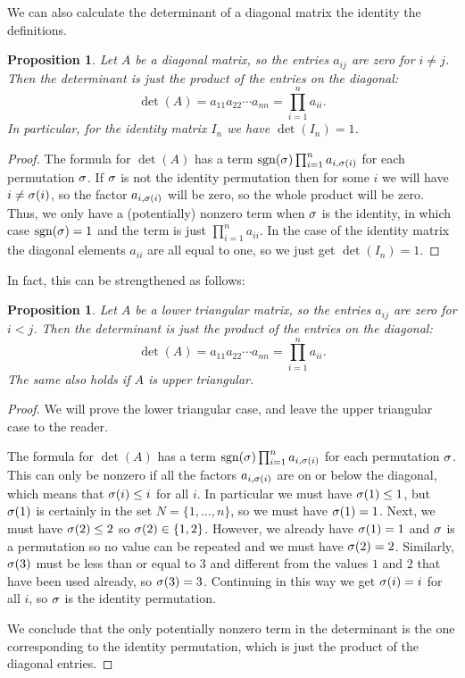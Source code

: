 \documentclass[reqno]{amsart}
\newtheorem{proposition}[theorem]{Proposition}
\theoremstyle{definition}
\begin{document}
We can also calculate the determinant of a diagonal matrix the
identity the definitions.
\begin{proposition}\label{prop-det-diag}
 Let $A$ be a diagonal matrix, so the entries $a_{ij}$ are zero for
 $i\neq j$.  Then the determinant is just the product of the entries
 on the diagonal:
 \[ \det(A) = a_{11} a_{22} \dotsb a_{nn} = \prod_{i=1}^n a_{ii}. \]
 In particular, for the identity matrix $I_n$ we have $\det(I_n)=1$.
\end{proposition}
\begin{proof}
 The formula for $\det(A)$ has a term
 $\operatorname{sgn}(\sigma)\prod_{i=1}^na_{i,\sigma(i)}$ for each permutation $\sigma$.  If
 $\sigma$ is not the identity permutation then for some $i$ we will have
 $i\neq\sigma(i)$, so the factor $a_{i,\sigma(i)}$ will be zero, so the
 whole product will be zero.  Thus, we only have a (potentially)
 nonzero term when $\sigma$ is the identity, in which case $\operatorname{sgn}(\sigma)=1$
 and the term is just $\prod_{i=1}^na_{ii}$.  In the case of the
 identity matrix the diagonal elements $a_{ii}$ are all equal to one,
 so we just get $\det(I_n)=1$.
\end{proof}

In fact, this can be strengthened as follows:
\begin{proposition}\label{prop-det-tri}
 Let $A$ be a lower triangular matrix, so the entries $a_{ij}$ are
 zero for $i<j$.  Then the determinant is just the product of the entries
 on the diagonal:
 \[ \det(A) = a_{11} a_{22} \dotsb a_{nn} = \prod_{i=1}^n a_{ii}. \]
 The same also holds if $A$ is upper triangular.
\end{proposition}
\begin{proof}
 We will prove the lower triangular case, and leave the upper
 triangular case to the reader.

 The formula for $\det(A)$ has a term
 $\operatorname{sgn}(\sigma)\prod_{i=1}^na_{i,\sigma(i)}$ for each permutation $\sigma$.
 This can only be nonzero if all the factors $a_{i,\sigma(i)}$ are on or
 below the diagonal, which means that $\sigma(i)\leq i$ for all $i$.  In
 particular we must have $\sigma(1)\leq 1$, but $\sigma(1)$ is certainly in
 the set $N=\{1,\dotsc,n\}$, so we must have $\sigma(1)=1$.  Next, we
 must have $\sigma(2)\leq 2$ so $\sigma(2)\in\{1,2\}$.  However, we already
 have $\sigma(1)=1$ and $\sigma$ is a permutation so no value can be
 repeated and we must have $\sigma(2)=2$.  Similarly, $\sigma(3)$ must be
 less than or equal to $3$ and different from the values $1$ and $2$
 that have been used already, so $\sigma(3)=3$.  Continuing in this way
 we get $\sigma(i)=i$ for all $i$, so $\sigma$ is the identity permutation.

 We conclude that the only potentially nonzero term in the determinant
 is the one corresponding to the identity permutation, which is just
 the product of the diagonal entries.
\end{proof}
\end{document}
